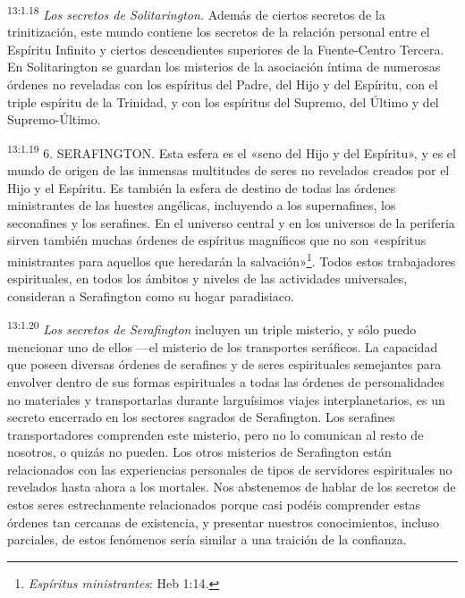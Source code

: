 \par
\textsuperscript{13:1.18} \textit{Los secretos de Solitarington.} Además de ciertos secretos de la trinitización, este mundo contiene los secretos de la relación personal entre el Espíritu Infinito y ciertos descendientes superiores de la Fuente-Centro Tercera. En Solitarington se guardan los misterios de la asociación íntima de numerosas órdenes no reveladas con los espíritus del Padre, del Hijo y del Espíritu, con el triple espíritu de la Trinidad, y con los espíritus del Supremo, del Último y del Supremo-Último.

\par
\textsuperscript{13:1.19} 6. SERAFINGTON. Esta esfera es el «seno del Hijo y del Espíritu», y es el mundo de origen de las inmensas multitudes de seres no revelados creados por el Hijo y el Espíritu. Es también la esfera de destino de todas las órdenes ministrantes de las huestes angélicas, incluyendo a los supernafines, los seconafines y los serafines. En el universo central y en los universos de la periferia sirven también muchas órdenes de espíritus magníficos que no son «espíritus ministrantes para aquellos que heredarán la salvación»\footnote{\textit{Espíritus ministrantes}: Heb 1:14.}. Todos estos trabajadores espirituales, en todos los ámbitos y niveles de las actividades universales, consideran a Serafington como su hogar paradisiaco.

\par
\textsuperscript{13:1.20} \textit{Los secretos de Serafington} incluyen un triple misterio, y sólo puedo mencionar uno de ellos ---el misterio de los transportes seráficos. La capacidad que poseen diversas órdenes de serafines y de seres espirituales semejantes para envolver dentro de sus formas espirituales a todas las órdenes de personalidades no materiales y transportarlas durante larguísimos viajes interplanetarios, es un secreto encerrado en los sectores sagrados de Serafington. Los serafines transportadores comprenden este misterio, pero no lo comunican al resto de nosotros, o quizás no pueden. Los otros misterios de Serafington están relacionados con las experiencias personales de tipos de servidores espirituales no revelados hasta ahora a los mortales. Nos abstenemos de hablar de los secretos de estos seres estrechamente relacionados porque casi podéis comprender estas órdenes tan cercanas de existencia, y presentar nuestros conocimientos, incluso parciales, de estos fenómenos sería similar a una traición de la confianza.

